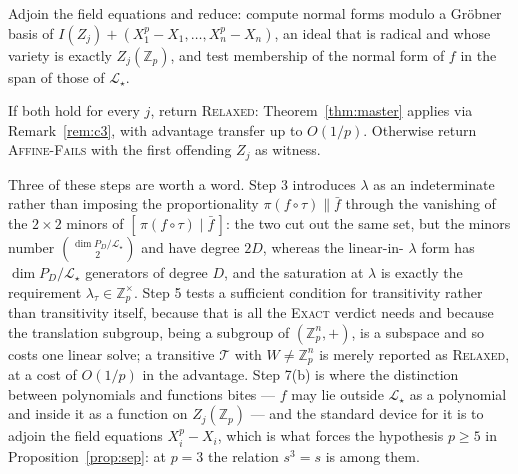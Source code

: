 \documentclass{aicr-solution}
\newcommand{\Zp}{\mathbb{Z}_p}
\newcommand{\Zpx}{\mathbb{Z}_p^{\times}}
\newcommand{\LL}{\mathcal{L}}
\begin{document}
\begin{procedurebox}
\begin{enumerate}[label=\textup{\arabic*.},leftmargin=2.2em,itemsep=3pt]
\begin{enumerate}[label=\textup{(\alph*)},leftmargin=2.2em,topsep=2pt,itemsep=1pt]
                Adjoin the field equations and reduce: compute normal forms modulo a Gr\"obner
                basis of $I(Z_j)+(X_1^{p}-X_1,\dots,X_n^{p}-X_n)$, an ideal that is radical and
                whose variety is exactly $Z_j(\Zp)$, and test membership of the normal form of
                $f$ in the span of those of $\LL_\star$.
        \end{enumerate}
        If both hold for every $j$, return \textsc{Relaxed}: Theorem~\ref{thm:master} applies
        via Remark~\ref{rem:c3}, with advantage transfer up to $O(1/p)$. Otherwise return
        \textsc{Affine-Fails} with the first offending $Z_j$ as witness.
\end{enumerate}
\end{procedurebox}

Three of these steps are worth a word. Step 3 introduces $\lambda$ as an indeterminate rather
than imposing the proportionality $\pi(f\circ\tau)\parallel\bar f$ through the vanishing of the
$2\times 2$ minors of $[\,\pi(f\circ\tau)\mid\bar f\,]$: the two cut out the same set, but the
minors number $\binom{\dim P_D/\LL_\star}{2}$ and have degree $2D$, whereas the linear-in-%
$\lambda$ form has $\dim P_D/\LL_\star$ generators of degree $D$, and the saturation at
$\lambda$ is exactly the requirement $\lambda_\tau\in\Zpx$. Step 5 tests a sufficient condition
for transitivity rather than transitivity itself, because that is all the \textsc{Exact} verdict
needs and because the translation subgroup, being a subgroup of $(\Zp^{n},+)$, is a subspace and
so costs one linear solve; a transitive $\mathcal T$ with $W\neq\Zp^{n}$ is merely reported as
\textsc{Relaxed}, at a cost of $O(1/p)$ in the advantage. Step 7(b) is where the distinction
between polynomials and functions bites --- $f$ may lie outside $\LL_\star$ as a polynomial and
inside it as a function on $Z_j(\Zp)$ --- and the standard device for it is to adjoin the field
equations $X_i^{p}-X_i$, which is what forces the hypothesis $p\ge 5$ in
Proposition~\ref{prop:sep}: at $p=3$ the relation $s^{3}=s$ is among them.
\end{document}
